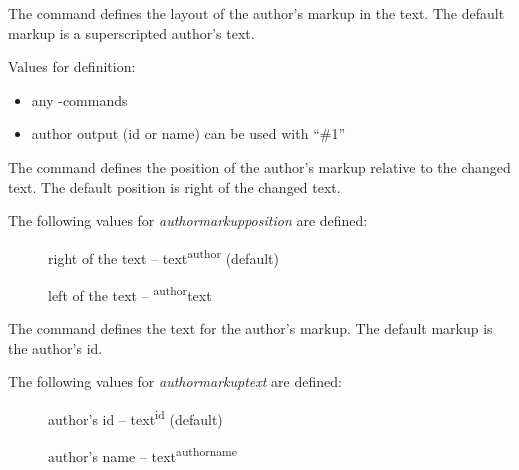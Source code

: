 
The command  defines the layout of the author's markup in the text.
The default markup is a superscripted author's text.

Values for definition:

\begin{itemize}
	\item any -commands
	\item author output (id or name) can be used with ``\#1''
\end{itemize}





The command  defines the position of the author's markup relative to the changed text.
The default position is right of the changed text.

The following values for \emph{authormarkupposition} are defined:

\begin{description}
	\item [] right of the text -- text\textsuperscript{author} (default)
	\item [] left of the text -- \textsuperscript{author}text
\end{description}





The command  defines the text for the author's markup.
The default markup is the author's id.

The following values for \emph{authormarkuptext} are defined:

\begin{description}
	\item [] author's id -- text\textsuperscript{id} (default)
	\item [] author's name -- text\textsuperscript{authorname}
\end{description}





